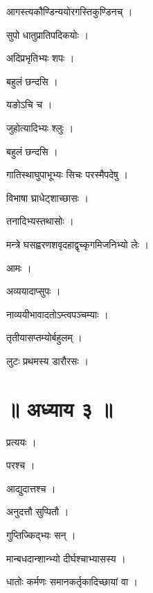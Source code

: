 \documentclass[10pt, openany]{book}
\begin{document}
\noindent आगस्त्यकौण्डिन्ययोरगस्तिकुण्डिनच् ।

\noindent सुपो धातुप्रातिपदिकयोः ।

\noindent अदिप्रभृतिभ्यः शपः ।

\noindent बहुलं छन्दसि ।

\noindent यङोऽचि च ।

\noindent जुहोत्यादिभ्यः श्लुः ।

\noindent बहुलं छन्दसि ।

\noindent गातिस्थाघुपाभूभ्यः सिचः परस्मैपदेषु ।

\noindent विभाषा घ्राधेट्शाच्छासः ।

\noindent तनादिभ्यस्तथासोः ।

\noindent मन्त्रे घसह्वरणशवृदहाद्वृच्कृगमिजनिभ्यो लेः ।

\noindent आमः ।

\noindent अव्ययादाप्सुपः ।

\noindent नाव्ययीभावादतोऽम्त्वपञ्चम्याः ।

\noindent तृतीयासप्तम्योर्बहुलम् ।

\noindent लुटः प्रथमस्य डारौरसः ।

\section*{॥ अध्याय ३ ॥}

\noindent प्रत्ययः ।

\noindent परश्च ।

\noindent आद्युदात्तश्च ।

\noindent अनुदत्तौ सुप्पितौ ।

\noindent गुप्तिज्किद्भ्यः सन् ।

\noindent मान्बधदान्शान्भ्यो दीर्घश्चाभ्यासस्य ।

\noindent धातोः कर्मणः समानकर्तृकादिच्छायां वा ।
\end{document}
